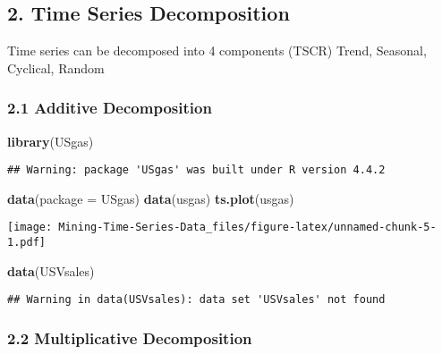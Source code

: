 \documentclass[
]{article}
\newenvironment{Shaded}{\begin{snugshade}}{\end{snugshade}}
\newcommand{\AttributeTok}[1]{\textcolor[rgb]{0.13,0.29,0.53}{#1}}
\newcommand{\FunctionTok}[1]{\textcolor[rgb]{0.13,0.29,0.53}{\textbf{#1}}}
\newcommand{\NormalTok}[1]{#1}
\newcommand{\StringTok}[1]{\textcolor[rgb]{0.31,0.60,0.02}{#1}}
\begin{document}
\subsection{2. Time Series
Decomposition}\label{time-series-decomposition}

Time series can be decomposed into 4 components (TSCR) Trend, Seasonal,
Cyclical, Random

\subsubsection{2.1 Additive Decomposition}\label{additive-decomposition}

\begin{Shaded}
\begin{Highlighting}[]
\FunctionTok{library}\NormalTok{(USgas)}
\end{Highlighting}
\end{Shaded}

\begin{verbatim}
## Warning: package 'USgas' was built under R version 4.4.2
\end{verbatim}

\begin{Shaded}
\begin{Highlighting}[]
\FunctionTok{data}\NormalTok{(}\AttributeTok{package =} \StringTok{\textquotesingle{}USgas\textquotesingle{}}\NormalTok{)}
\FunctionTok{data}\NormalTok{(usgas)}
\FunctionTok{ts.plot}\NormalTok{(usgas)}
\end{Highlighting}
\end{Shaded}

\texttt{[image: Mining-Time-Series-Data\_files/figure-latex/unnamed-chunk-5-1.pdf]}

\begin{Shaded}
\begin{Highlighting}[]
\FunctionTok{data}\NormalTok{(USVsales)}
\end{Highlighting}
\end{Shaded}

\begin{verbatim}
## Warning in data(USVsales): data set 'USVsales' not found
\end{verbatim}

\subsubsection{2.2 Multiplicative
Decomposition}\label{multiplicative-decomposition}
\end{document}
